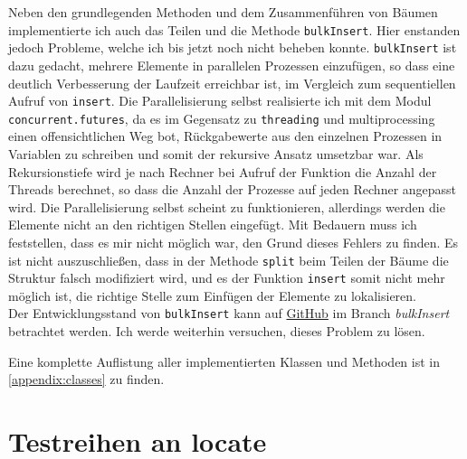 Neben den grundlegenden Methoden und dem Zusammenführen von Bäumen implementierte ich auch das Teilen und die Methode \texttt{bulkInsert}. Hier enstanden jedoch Probleme, welche ich bis jetzt noch nicht beheben konnte. \texttt{bulkInsert} ist dazu gedacht, mehrere Elemente in parallelen Prozessen einzufügen, so dass eine deutlich Verbesserung der Laufzeit erreichbar ist, im Vergleich zum sequentiellen Aufruf von \texttt{insert}. Die Parallelisierung selbst realisierte ich mit dem Modul \texttt{concurrent.futures}, da es im Gegensatz zu \texttt{threading} und {multiprocessing} einen offensichtlichen Weg bot, Rückgabewerte aus den einzelnen Prozessen in Variablen zu schreiben und somit der rekursive Ansatz umsetzbar war. Als Rekursionstiefe wird je nach Rechner bei Aufruf der Funktion die Anzahl der Threads berechnet, so dass die Anzahl der Prozesse auf jeden Rechner angepasst wird. Die Parallelisierung selbst scheint zu funktionieren, allerdings werden die Elemente nicht an den richtigen Stellen eingefügt. Mit Bedauern muss ich feststellen, dass es mir nicht möglich war, den Grund dieses Fehlers zu finden. Es ist nicht auszuschließen, dass in der Methode \texttt{split} beim Teilen der Bäume die Struktur falsch modifiziert wird, und es der Funktion \texttt{insert} somit nicht mehr möglich ist, die richtige Stelle zum Einfügen der Elemente zu lokalisieren.
\\
Der Entwicklungsstand von \texttt{bulkInsert} kann auf \href{https://github.com/joshuajeschek/SortedSequences}{GitHub} im Branch \textit{bulkInsert} betrachtet werden. Ich werde weiterhin versuchen, dieses Problem zu lösen.
\par
Eine komplette Auflistung aller implementierten Klassen und Methoden ist in \autoref{appendix:classes} zu finden.

\section{Testreihen an locate}
\label{chapter:benchmarks}

